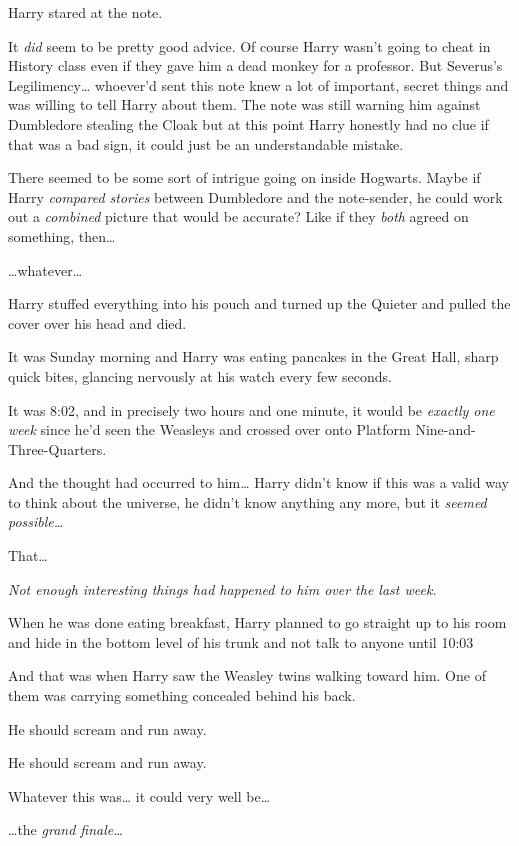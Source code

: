 Harry stared at the note.

It \emph{did} seem to be pretty good advice. Of course Harry wasn't going to cheat in History class even if they gave him a dead monkey for a professor. But Severus's Legilimency{\ldots} whoever'd sent this note knew a lot of important, secret things and was willing to tell Harry about them. The note was still warning him against Dumbledore stealing the Cloak but at this point Harry honestly had no clue if that was a bad sign, it could just be an understandable mistake.

There seemed to be some sort of intrigue going on inside Hogwarts. Maybe if Harry \emph{compared stories} between Dumbledore and the note-sender, he could work out a \emph{combined} picture that would be accurate? Like if they \emph{both} agreed on something, then{\ldots}

{\ldots}whatever{\ldots}

Harry stuffed everything into his pouch and turned up the Quieter and pulled the cover over his head and died.

\later

It was Sunday morning and Harry was eating pancakes in the Great Hall, sharp quick bites, glancing nervously at his watch every few seconds.

It was 8:02\am, and in precisely two hours and one minute, it would be \emph{exactly one week} since he'd seen the Weasleys and crossed over onto Platform Nine-and-Three-Quarters.

And the thought had occurred to him{\ldots} Harry didn't know if this was a valid way to think about the universe, he didn't know anything any more, but it \emph{seemed possible{\ldots}}

That{\ldots}

\emph{Not enough interesting things had happened to him over the last week.}

When he was done eating breakfast, Harry planned to go straight up to his room and hide in the bottom level of his trunk and not talk to anyone until 10:03\am

And that was when Harry saw the Weasley twins walking toward him. One of them was carrying something concealed behind his back.

He should scream and run away.

He should scream and run away.

Whatever this was{\ldots} it could very well be{\ldots}

{\ldots}the \emph{grand finale{\ldots}}

